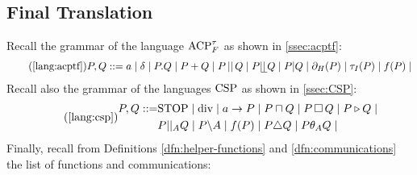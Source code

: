 \documentclass[../hons_project.tex]{subfiles}
\begin{document}
\subsection{Final Translation}

Recall the grammar of the language $\mathrm{ACP}_{F}^{\tau}$ as shown in \cref{ssec:acptf}:
\begin{align}\tag{\ref{lang:acptf}}
	P, Q ::= a \mid \delta \mid P . Q \mid P + Q \mid P \merge Q \mid P \leftmerge Q \mid P | Q \mid \restrict(P) \mid \abtau(P) \mid f(P) \mid
\end{align}
Recall also the grammar of the languages $\mathrm{CSP}$ as shown in \cref{ssec:CSP}:
\begin{align}\tag{\ref{lang:csp}}
	\begin{aligned}
	P, Q ::= & \mathrm{STOP} \mid \mathrm{div} \mid a\to P \mid P \sqcap Q \mid P \extchoice Q \mid P \sliding Q \mid \\
	         & P | |_{A} Q \mid P \backslash A \mid f(P) \mid P \triangle Q \mid P \theta_{A} Q \mid
	\end{aligned}
\end{align}
\vspace{-10pt}
Finally, recall from Definitions \ref{dfn:helper-functions} and \ref{dfn:communications} the list of functions and communications:
\end{document}
